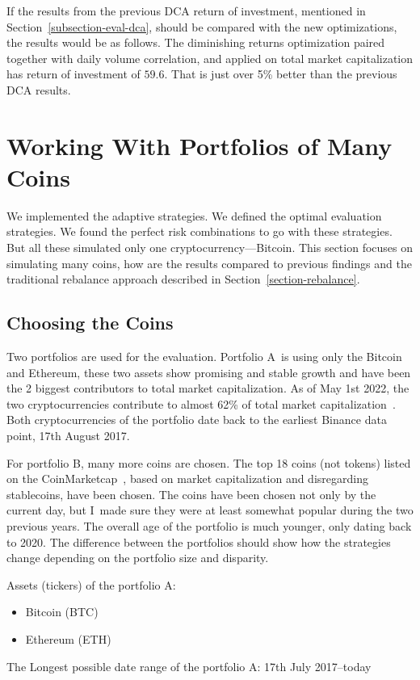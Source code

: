 If the results from the previous DCA return of investment, mentioned in Section~\ref{subsection-eval-dca}, should be compared with the new optimizations, the results would be as follows. The diminishing returns optimization paired together with daily volume correlation, and applied on total market capitalization has return of investment of $59.6$. That is just over 5\% better than the previous DCA results.

\section{Working With Portfolios of Many Coins}
We implemented the adaptive strategies. We defined the optimal evaluation strategies. We found the perfect risk combinations to go with these strategies. But all these simulated only one cryptocurrency---Bitcoin. This section focuses on simulating many coins, how are the results compared to previous findings and the traditional rebalance approach described in Section~\ref{section-rebalance}.

\subsection*{Choosing the Coins}
Two portfolios are used for the evaluation. Portfolio A~is using only the Bitcoin and Ethereum, these two assets show promising and stable growth and have been the 2 biggest contributors to total market capitalization. As of May 1st 2022, the two cryptocurrencies contribute to almost 62\% of total market capitalization~\cite{coinmarketcap:globalmetrics}. Both cryptocurrencies of the portfolio date back to the earliest Binance data point, 17th August 2017.

For portfolio B, many more coins are chosen. The top 18 coins (not tokens) listed on the CoinMarketcap~\cite{coinmarketcap}, based on market capitalization and disregarding stablecoins, have been chosen. The coins have been chosen not only by the current day, but I~made sure they were at least somewhat popular during the two previous years. The overall age of the portfolio is much younger, only dating back to 2020. The difference between the portfolios should show how the strategies change depending on the portfolio size and disparity.

Assets (tickers) of the portfolio A:
\begin{itemize}
    \item Bitcoin (BTC)
    \item Ethereum (ETH)
\end{itemize}
The Longest possible date range of the portfolio A: 17th July 2017--today

